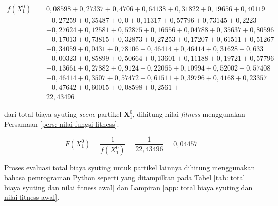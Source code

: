 {{\begin{enumerate}[align = left, left = 0cm, nolistsep]
              {\footnotesize
              \begin{equation*}
                  \begin{aligned}
                      f(X_{1}^{0})  = & 0,08598+0,27337+0,4706+0,64138+0,31822+0,19656+0,40119   \\
                                      & +0,27259+0,35487+0,0+0,11317+0,57796+0,73145+0,2223      \\
                                      & +0,27624+0,12581+0,52875+0,16656+0,04788+0,35637+0,80596 \\
                                      & +0,17013+0,73815+0,32873+0,27253+0,17207+0,61511+0,51267 \\
                                      & +0,34059+0,0431+0,78106+0,46414+0,46414+0,31628+0,633    \\
                                      & +0,00323+0,85899+0,50664+0,13601+0,11188+0,19721+0,57796 \\
                                      & +0,13661+0,27882+0,9124+0,22065+0,10994+0,52002+0,57408  \\
                                      & +0,46414+0,3507+0,57472+0,61511+0,39796+0,4168+0,23357   \\
                                      & +0,47642+0,60015+0,08598+0,2561+                         \\
                      =               & 22,43496
                  \end{aligned}
              \end{equation*}
              }

              dari total biaya syuting \textit{scene} partikel $\boldsymbol{X}_{1}^{0}$, dihitung nilai \textit{fitness} menggunakan Persamaan \ref{pers: nilai fungsi fitness}.

              \begin{equation*}
                  F(X_{1}^{0}) = \frac{1}{f(X_{1}^{0})} = \frac{1}{22,43496} = 0,04457
              \end{equation*}

              Proses evaluasi total biaya syuting untuk partikel lainnya dihitung menggunakan bahasa pemrograman Python seperti yang ditampilkan pada Tabel \ref{tab: total biaya syuting dan nilai fitness awal} dan Lampiran \ref{app: total biaya syuting dan nilai fitness awal}.


\end{enumerate}}}
